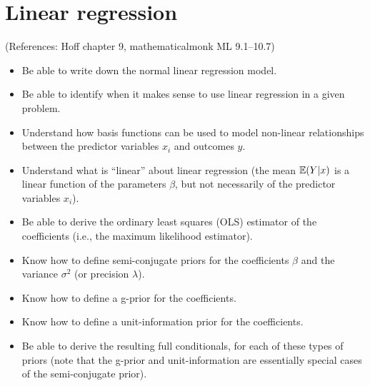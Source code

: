 \documentclass[12pt]{article}
\begin{document}
\section{Linear regression}
(References: Hoff chapter 9, mathematicalmonk ML 9.1--10.7)
\begin{itemize}
\setlength\itemsep{0em}
\item Be able to write down the normal linear regression model.
\item Be able to identify when it makes sense to use linear regression in a given problem.
\item Understand how basis functions can be used to model non-linear relationships between the predictor variables $x_i$ and outcomes $y$.
\item Understand what is ``linear'' about linear regression (the mean $\mathbb{E}(Y|x)$ is a linear function of the parameters $\beta$, but not necessarily
    of the predictor variables $x_i$).
\item Be able to derive the ordinary least squares (OLS) estimator of the coefficients (i.e., the maximum likelihood estimator).
\item Know how to define semi-conjugate priors for the coefficients $\beta$ and the variance $\sigma^2$ (or precision $\lambda$).
\item Know how to define a g-prior for the coefficients.
\item Know how to define a unit-information prior for the coefficients.
\item Be able to derive the resulting full conditionals, for each of these types of priors
    (note that the g-prior and unit-information are essentially special cases of the semi-conjugate prior).
\end{itemize}
\end{document}
